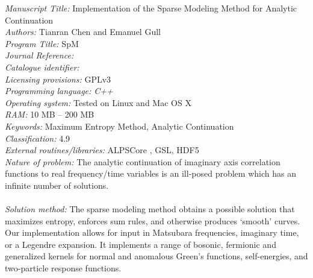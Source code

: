 \documentclass[final,5p,twocolumn,12pt]{elsarticle}
\newcounter{bla}
\begin{document}
\begin{small}
\noindent
{\em Manuscript Title: }   Implementation of the Sparse Modeling Method for Analytic Continuation                                    \\
{\em Authors: }                       Tianran Chen and Emanuel Gull                         \\
{\em Program Title: }      SpM                                   \\
{\em Journal Reference:}                                      \\
{\em Catalogue identifier:}                                   \\
{\em Licensing provisions:}     GPLv3                               \\
{\em Programming language: C++}                                   \\
{\em Operating system:} Tested on Linux and Mac OS X                                    \\
{\em RAM:} 10 MB -- 200 MB                                              \\
{\em Keywords:} Maximum Entropy Method, Analytic Continuation \\
{\em Classification:} 4.9 \\
{\em External routines/libraries:} ALPSCore \citep{ALPS20}\cite{ALPSCore}, GSL, HDF5 \\
{\em Nature of problem:
}The analytic continuation of imaginary axis correlation functions to real frequency/time variables is an ill-posed problem which has an infinite number of solutions. \\
   \\
{\em Solution method: }The sparse modeling method obtains a possible solution that maximizes entropy, enforces sum rules, and otherwise produces `smooth' curves.  Our implementation allows for input in Matsubara frequencies, imaginary time, or a Legendre expansion. It implements a range of bosonic, fermionic and generalized kernels for normal and anomalous Green's functions, self-energies, and two-particle response functions.\\

\end{small}
\end{document}
